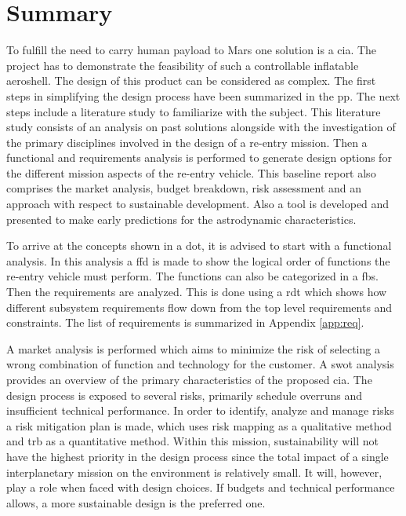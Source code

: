 \section*{Summary}\label{cha:summary}

To fulfill the need to carry human payload to Mars one solution is a \acrfull{cia}. The project has to demonstrate the feasibility of such a controllable inflatable aeroshell. The design of this product can be considered as complex. The first steps in simplifying the design process have been summarized in the \acrfull{pp}. The next steps include a literature study to familiarize with the subject. This literature study consists of an analysis on past solutions alongside with the investigation of the primary disciplines involved in the design of a re-entry mission. Then a functional and requirements analysis is performed to generate design options for the different mission aspects of the re-entry vehicle. This baseline report also comprises the market analysis, budget breakdown, risk assessment and an approach with respect to sustainable development. Also a tool is developed and presented to make early predictions for the astrodynamic characteristics. 

To arrive at the concepts shown in a \acrfull{dot}, it is advised to start with a functional analysis. In this analysis a \acrfull{ffd} is made to show the logical order of functions the re-entry vehicle must perform. The functions can also be categorized in a \acrfull{fbs}. Then the requirements are analyzed. This is done using a \gls{rdt} which shows how different subsystem requirements flow down from the top level requirements and constraints. The list of requirements is summarized in Appendix \ref{app:req}.

A market analysis is performed which aims to minimize the risk of selecting a wrong combination of function and technology for the customer. A \acrfull{swot} analysis provides an overview of the primary characteristics of the proposed \gls{cia}. The design process is exposed to several risks, primarily schedule overruns and insufficient technical performance. In order to identify, analyze and manage risks a risk mitigation plan is made, which uses risk mapping as a qualitative method and \gls{trb} as a quantitative method. Within this mission, sustainability will not have the highest priority in the design process since the total impact of a single interplanetary mission on the environment is relatively small. It will, however, play a role when faced with design choices. If budgets and technical performance allows, a more sustainable design is the preferred one.

